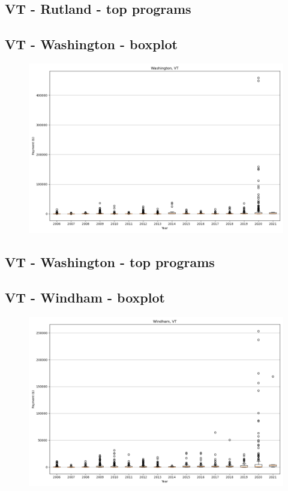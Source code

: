 \subsection*{VT - Rutland - top programs}

\newpage
\subsection*{VT - Washington - boxplot}
\begin{figure}[h]
\centering
\includegraphics[width=7in]{../output/boxplots/counties/Washington-VT_boxplot.png}
\end{figure}


\subsection*{VT - Washington - top programs}

\newpage
\subsection*{VT - Windham - boxplot}
\begin{figure}[h]
\centering
\includegraphics[width=7in]{../output/boxplots/counties/Windham-VT_boxplot.png}
\end{figure}


